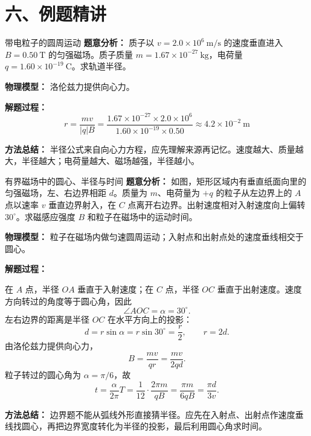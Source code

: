 \section*{六、例题精讲}

\begin{examplebox}{带电粒子的圆周运动}
\textbf{题意分析：} 质子以 $v=2.0\times 10^6\ \mathrm{m/s}$ 的速度垂直进入 $B=0.50\ \mathrm{T}$ 的匀强磁场。质子质量 $m=1.67\times10^{-27}\ \mathrm{kg}$，电荷量 $q=1.60\times10^{-19}\ \mathrm{C}$。求轨道半径。

\textbf{物理模型：} 洛伦兹力提供向心力。

\begin{center}

\end{center}

\textbf{解题过程：}
\[
r=\frac{mv}{|q|B}
=\frac{1.67\times10^{-27}\times2.0\times10^6}
{1.60\times10^{-19}\times0.50}
\approx 4.2\times10^{-2}\ \mathrm{m}
\]

\textbf{方法总结：} 半径公式来自向心力方程，应先理解来源再记忆。速度越大、质量越大，半径越大；电荷量越大、磁场越强，半径越小。
\end{examplebox}

\begin{examplebox}{有界磁场中的圆心、半径与时间}
\textbf{题意分析：} 如图，矩形区域内有垂直纸面向里的匀强磁场，左、右边界相距 $d$。质量为 $m$、电荷量为 $+q$ 的粒子从左边界上的 $A$ 点以速率 $v$ 垂直边界射入，在 $C$ 点离开右边界。出射速度相对入射速度向上偏转 $30^\circ$。求磁感应强度 $B$ 和粒子在磁场中的运动时间。

\textbf{物理模型：} 粒子在磁场内做匀速圆周运动；入射点和出射点处的速度垂线相交于圆心。

\begin{center}

\end{center}

\textbf{解题过程：}

在 $A$ 点，半径 $OA$ 垂直于入射速度；在 $C$ 点，半径 $OC$ 垂直于出射速度。速度方向转过的角度等于圆心角，因此
\[
\angle AOC=\alpha=30^\circ.
\]
左右边界的距离是半径 $OC$ 在水平方向上的投影：
\[
d=r\sin\alpha=r\sin30^\circ=\frac{r}{2},
\qquad r=2d.
\]
由洛伦兹力提供向心力，
\[
B=\frac{mv}{qr}=\boxed{\frac{mv}{2qd}}.
\]
粒子转过的圆心角为 $\alpha=\pi/6$，故
\[
t=\frac{\alpha}{2\pi}T
=\frac{1}{12}\cdot\frac{2\pi m}{qB}
=\boxed{\frac{\pi m}{6qB}}
=\boxed{\frac{\pi d}{3v}}.
\]

\textbf{方法总结：} 边界题不能从弧线外形直接猜半径。应先在入射点、出射点作速度垂线找圆心，再把边界宽度转化为半径的投影，最后利用圆心角求时间。
\end{examplebox}

